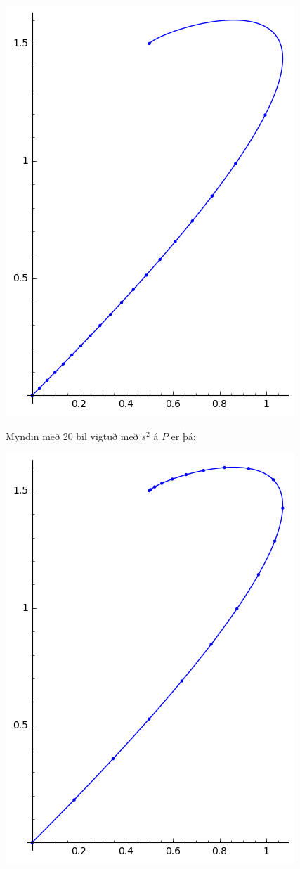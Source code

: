 \documentclass{article}
\begin{document}
\begin{center}
\includegraphics[scale=0.7]{20pt1}
\end{center}

\vspace*{0.5cm}

Myndin með 20 bil vigtuð með $s^2$ á $P$ er þá: \\

\begin{center}
\includegraphics[scale=0.7]{20pt2}
\end{center}
\end{document}
